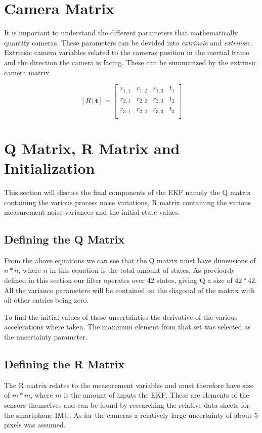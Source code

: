 \section{Camera Matrix}

It is important to understand the different parameters that mathematically quantify cameras. These parameters can be devided into \textit{extrinsic} and \textit{extrinsic}. Extrinsic camera variables related to the cameras position in the inertial frame and the direction the camera is facing. These can be summarized by the extrinsic camera matrix 

$$[ R \, |\, \boldsymbol{t}] = 
\left[ \begin{array}{ccc|c} 
r_{1,1} & r_{1,2} & r_{1,3} & t_1 \\
r_{2,1} & r_{2,2} & r_{2,3} & t_2 \\
r_{3,1} & r_{3,2} & r_{3,3} & t_3 \\
\end{array} \right]$$


\section{Q Matrix, R Matrix and Initialization}
This section will discuss the final components of the EKF namely the Q matrix containing the various process noise variations, R matrix containing the various measurement noise variances and the initial state values.

\subsection{Defining the Q Matrix}
From the above equations we can see that the Q matrix must have dimensions of $n*n$, where $n$ in this equation is the total amount of states. As previously defined in this section our filter operates over 42 states, giving Q a size of $42*42$. All the variance parameters will be contained on the diagonal of the matrix with all other entries being zero.

To find the initial values of these uncertainties the derivative of the various accelerations where taken. The maximum element from that set was selected as the uncertainty parameter.

\subsection{Defining the R Matrix}
The R matrix relates to the measurement variables and must therefore have size of $m*m$, where $m$ is the amount of inputs the EKF. These are elements of the sensors themselves and can be found by researching the relative data sheets for the smartphone IMU. As for the cameras a relatively large uncertainty of about 5 pixels was assumed.

